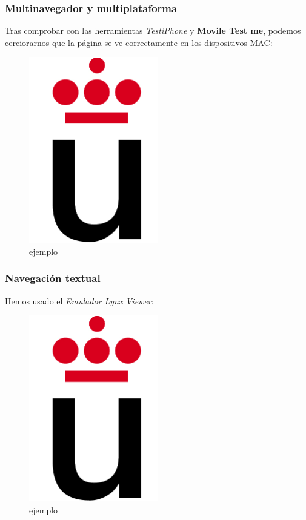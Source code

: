 \subsubsection{Multinavegador y multiplataforma}
Tras comprobar con las herramientas \textit{TestiPhone} y \textbf{Movile Test me}, podemos cerciorarnos que la página se ve correctamente en los dispositivos MAC:
\begin{figure}[h]
	\centering
	\includegraphics[width=0.50\textwidth]{./Fotos/logoURJC.jpg}
	\caption{ejemplo}
	\label{fig: ejemplo}
\end{figure}

\subsubsection{Navegación textual}
Hemos usado el \textit{Emulador Lynx Viewer}:

\begin{figure}[h]
	\centering
	\includegraphics[width=0.50\textwidth]{./Fotos/logoURJC.jpg}
	\caption{ejemplo}
	\label{fig: ejemplo}
\end{figure}


